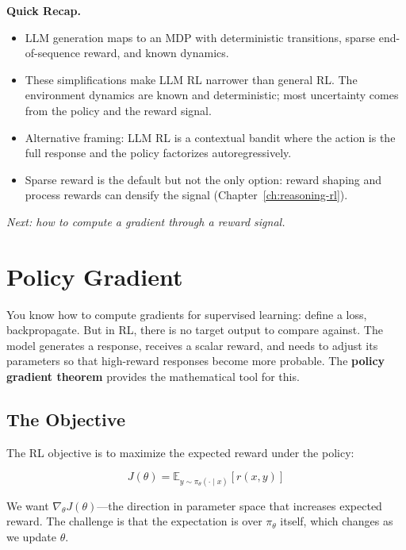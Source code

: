 \begin{quickrecap}
\textbf{Quick Recap.}
\begin{itemize}[nosep,leftmargin=1.5em]
  \item LLM generation maps to an MDP with deterministic transitions, sparse end-of-sequence reward, and known dynamics.
  \item These simplifications make LLM RL narrower than general RL. The environment dynamics are known and deterministic; most uncertainty comes from the policy and the reward signal.
  \item Alternative framing: LLM RL is a contextual bandit where the action is the full response and the policy factorizes autoregressively.
  \item Sparse reward is the default but not the only option: reward shaping and process rewards can densify the signal (Chapter~\ref{ch:reasoning-rl}).
\end{itemize}
\textit{Next: how to compute a gradient through a reward signal.}
\end{quickrecap}


\section{Policy Gradient}
\label{sec:policy-gradient}

You know how to compute gradients for supervised learning: define a loss, backpropagate. But in RL, there is no target output to compare against. The model generates a response, receives a scalar reward, and needs to adjust its parameters so that high-reward responses become more probable. The \textbf{policy gradient theorem} provides the mathematical tool for this.

\subsection{The Objective}

The RL objective is to maximize the expected reward under the policy:

\begin{equation}
\label{eq:rl-objective}
J(\theta) = \mathbb{E}_{y \sim \pi_\theta(\cdot \mid x)}\!\left[r(x, y)\right]
\end{equation}

We want $\nabla_\theta J(\theta)$---the direction in parameter space that increases expected reward. The challenge is that the expectation is over $\pi_\theta$ itself, which changes as we update $\theta$.

